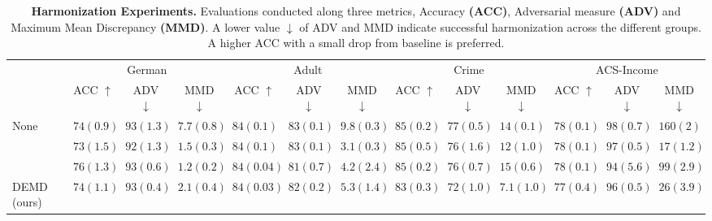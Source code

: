 \begin{table}[!t] 
	\scriptsize
	\setlength\tabcolsep{2.25pt} %
	\caption{\footnotesize {\bf Harmonization Experiments.} Evaluations conducted along three metrics, Accuracy \textbf{(ACC)}, Adversarial measure \textbf{(ADV)} and Maximum Mean Discrepancy \textbf{(MMD)}. A lower value $\downarrow$ of ADV and MMD indicate successful harmonization across the different groups. A higher ACC with a small drop from baseline is preferred. }
	\vspace{-10pt}
	\begin{tabular*}{\linewidth}{l *{3}{c}|*{3}{c}|*{3}{c}|*{3}{c}}
		\midrule%
		& \multicolumn{3}{c}{German} & \multicolumn{3}{c}{Adult} & \multicolumn{3}{c}{Crime}& \multicolumn{3}{c}{ACS-Income} \\
		\cmidrule{2-4} \cmidrule{5-7} \cmidrule{8-10} \cmidrule{11-13}
		& ACC $\uparrow$ & ADV $\downarrow$ & MMD $\downarrow$ & ACC $\uparrow$ & ADV $\downarrow$ & MMD $\downarrow$ & ACC $\uparrow$ & ADV $\downarrow$ & MMD $\downarrow$ & ACC $\uparrow$ & ADV $\downarrow$  & MMD $\downarrow$ \\ 
		\midrule
		None & $74\scriptscriptstyle(0.9)$ & $93\scriptscriptstyle(1.3)$ & $7.7\scriptscriptstyle(0.8)$ & $84\scriptscriptstyle(0.1)$ & $83\scriptscriptstyle(0.1)$ & $9.8\scriptscriptstyle(0.3)$ & $85\scriptscriptstyle(0.2)$ & $77\scriptscriptstyle(0.5)$ & $14\scriptscriptstyle(0.1)$ & $78\scriptscriptstyle(0.1)$ & $98\scriptscriptstyle(0.7)$ & $160\scriptscriptstyle(2)$ \\
		\cite{zemel} & $73\scriptscriptstyle(1.5)$ & $92\scriptscriptstyle(1.3)$ & $1.5\scriptscriptstyle(0.3)$ & $84\scriptscriptstyle(0.1)$ & $83\scriptscriptstyle(0.1)$ & $3.1\scriptscriptstyle(0.3)$ & $85\scriptscriptstyle(0.5)$ & $76\scriptscriptstyle(1.6)$ & $12\scriptscriptstyle(1.0)$ & $78\scriptscriptstyle(0.1)$ & $97\scriptscriptstyle(0.5)$ & $17\scriptscriptstyle(1.2)$ \\
		\cite{cai} & $76\scriptscriptstyle(1.3)$ & $93\scriptscriptstyle(0.6)$ & $1.2\scriptscriptstyle(0.2)$ & $84\scriptscriptstyle(0.04)$ & $81\scriptscriptstyle(0.7)$ & $4.2\scriptscriptstyle(2.4)$ & $85\scriptscriptstyle(0.2)$ & $76\scriptscriptstyle(0.7)$ & $15\scriptscriptstyle(0.6)$ & $78\scriptscriptstyle(0.1)$ & $94\scriptscriptstyle(5.6)$ & $99\scriptscriptstyle(2.9)$ \\
		DEMD (ours) & $74\scriptscriptstyle(1.1)$ & $93\scriptscriptstyle(0.4)$ & $2.1\scriptscriptstyle(0.4)$ & $84\scriptscriptstyle(0.03)$ & $82\scriptscriptstyle(0.2)$ & $5.3\scriptscriptstyle(1.4)$ & $83\scriptscriptstyle(0.3)$ & $72\scriptscriptstyle(1.0)$ & $7.1\scriptscriptstyle(1.0)$ & $77\scriptscriptstyle(0.4)$ & $96\scriptscriptstyle(0.5)$ & $26\scriptscriptstyle(3.9)$ \\
		\midrule
	\end{tabular*}
	\label{tab:harm_results}
\end{table} 


